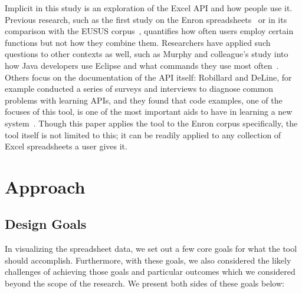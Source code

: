 \documentclass[conference]{IEEEtran}
\begin{document}
	Implicit in this study is an exploration of the Excel API and how people use
	it. Previous research, such as the first study on the Enron
	spreadsheets~\cite{hermans2015enron} or in its comparison with the EUSUS
	corpus~\cite{jansen2015enron}, quantifies how often users employ certain
	functions but not how they combine them. Researchers have applied such
	questions to other contexts as well, such as Murphy and colleague's study into
	how Java developers use Eclipse and what commands they use most
	often~\cite{murphy2006java}. Others focus on the documentation of the API
	itself: Robillard and DeLine, for example conducted a series of surveys and
	interviews to diagnose common problems with learning APIs, and they found that
	code examples, one of the focuses of this tool, is one of the most important
	aids to have in learning a new system~\cite{robillard2011field}. Though this
	paper applies the tool to the Enron corpus specifically, the tool itself is not
	limited to this; it can be readily applied to any collection of Excel
	spreadsheets a user gives it.
	
	\section{Approach}
	
	\subsection{Design Goals} \label{goals} In visualizing the spreadsheet data, we
	set out a few core goals for what the tool should accomplish. Furthermore, with
	these goals, we also considered the likely challenges of achieving those goals
	and particular outcomes which we considered beyond the scope of the research.
	We present both sides of these goals below:
	
\end{document}
